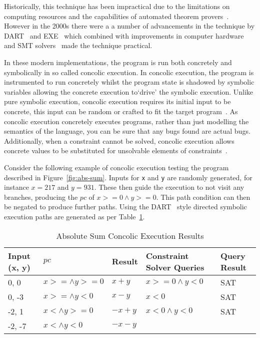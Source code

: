 \documentclass[]{final_report}
\begin{document}
Historically, this technique has been impractical due to the limitations on computing resources and the capabilities of automated theorem provers~\cite{king1976symbolic}. However in the 2000s there were a a number of advancements in the technique by DART~\cite{godefroid2005dart} and EXE~\cite{cadar2008exe} which combined with improvements in computer hardware and SMT solvers~\cite{de2011satisfiability} made the technique practical.

In these modern implementations, the program is run both concretely and symbolically in so called concolic execution. In concolic execution, the program is instrumented to run concretely whilst the program state is shadowed by symbolic variables allowing the concrete execution to`drive' the symbolic execution. Unlike pure symbolic execution, concolic execution requires its initial input to be concrete, this input can be random or crafted to fit the target program~\cite{godefroid2008grammar,cadar2013symbolic}. As concolic execution concretely executes programs, rather than just modelling the semantics of the language, you can be sure that any bugs found are actual bugs. Additionally, when a constraint cannot be solved, concolic execution allows concrete values to be substituted for unsolvable elements of constraints~\cite{sen2007concolic,sen2005cute}.

Consider the following example of concolic execution testing the program described in Figure~\ref{fig:abs-sum}. Inputs for \lstinline{x} and \lstinline{y} are randomly generated, for instance $x=217$ and $y=931$. These then guide the execution to not visit any branches, producing the $pc$ of $x >= 0 \land y >=0$. This path condition can then be negated to produce further paths. Using the DART~\cite{godefroid2005dart} style directed symbolic execution paths are generated as per Table~\ref{abs-sum-ce-table}.

\begin{table}[]
\centering
\begin{tabular}{|l|l|l|l|l|}
\hline
Input (x, y) & $pc$ & Result & Constraint Solver Queries & Query Result \\ \hline
0, 0 & $x >= \land y >= 0$ & $x+y$ & $x >=0 \land y < 0 $ & SAT \\ \hline
0, -3 & $x >= \land y < 0$ & $x - y$ & $x <0 $ & SAT \\ \hline
-2, 1 & $x < \land y >= 0$ & $-x+y$ & $x<0 \land y < 0 $ & SAT \\ \hline
-2, -7 & $x < \land y < 0$ & $-x-y$ &  &  \\ \hline
\end{tabular}
\caption{Absolute Sum Concolic Execution Results}
\label{abs-sum-ce-table}
\end{table}
\end{document}

